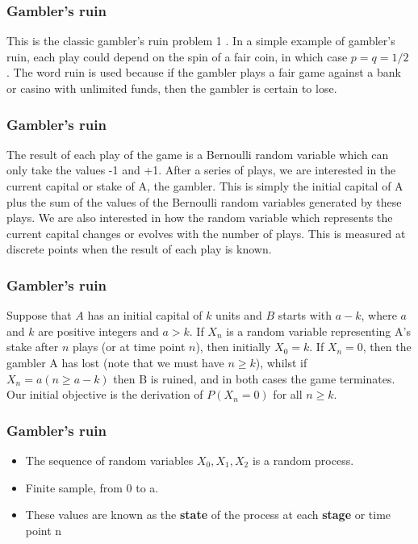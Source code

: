 \documentclass[spanish]{beamer}
\begin{document}
\begin{frame}
\frametitle{Gambler’s ruin}
This is the classic gambler’s ruin problem 1 . In a simple example
of gambler’s ruin, each play could depend on the spin of a fair coin, in which case
$p = q =1/2$ . The word ruin is used because if the gambler plays a fair game against a bank or casino with unlimited funds, then the gambler is certain to lose.
\end{frame}
\begin{frame}
\frametitle{Gambler’s ruin}
The result of each play of the game is a Bernoulli random variable which can only take the values -1 and +1. After a series of plays, we are interested in the current capital or stake of A, the gambler. This is simply the initial capital of A plus the sum of the values of the Bernoulli random variables generated by these plays. We are also interested in how the random variable which represents the current capital changes or evolves with the number of plays. This is measured at discrete points when the result of each play is known.

\end{frame}
\begin{frame}
\frametitle{Gambler’s ruin}
Suppose that $A$ has an initial capital of $k$ units and $B$ starts with $a - k$, where $a$ and $k$ are positive integers and $a > k$. If $X_n$ is a random variable representing A’s stake after $n$ plays (or at time point $n$), then initially $X_0 = k$. If $X_{n} = 0$, then the gambler A has lost (note that we must have $n \geq k$), whilst if $X_{n} = a (n  \geq a - k)$ then B is ruined, and in both cases the game terminates. Our initial objective is the derivation of $P(X_{n} = 0)$ for all $n \geq k$.
\end{frame}
\begin{frame}
\frametitle{Gambler’s ruin}
\begin{itemize}
\item The sequence of random variables $X_{0} , X_{1} , X_{2}$ is a random process.
\item Finite sample, from 0 to a. 
\item These values are known as the \textbf{state} of the process at each \textbf{stage} or time point n
\end{itemize}
\end{frame}
\end{document}
